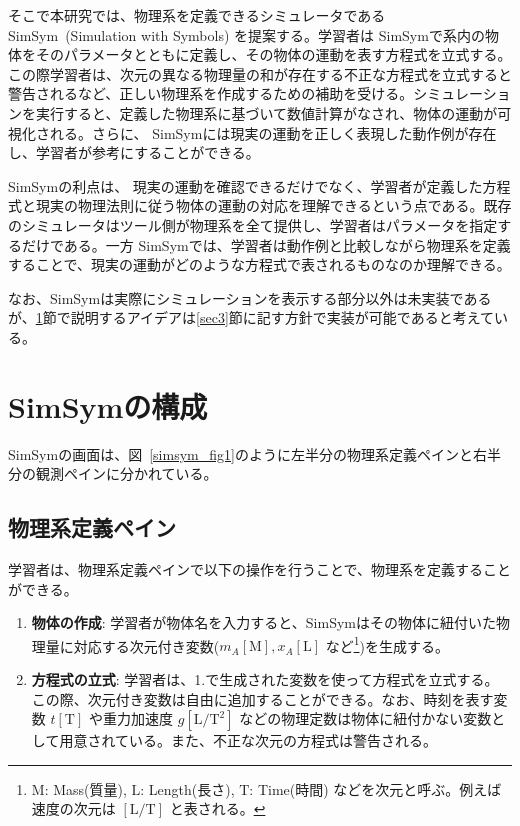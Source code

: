 \documentclass[11pt, a4paper, oneside, twocolumn, dvipdfmx]{jsarticle}
\newcommand{\simname}{SimSym}
\newcommand{\simnamealt}{Simulation with Symbols}
\begin{document}
そこで本研究では、物理系を定義できるシミュレータである \simname~(\simnamealt) を提案する。学習者は \simname で系内の物体をそのパラメータとともに定義し、その物体の運動を表す方程式を立式する。この際学習者は、次元の異なる物理量の和が存在する不正な方程式を立式すると警告されるなど、正しい物理系を作成するための補助を受ける。シミュレーションを実行すると、定義した物理系に基づいて数値計算がなされ、物体の運動が可視化される。さらに、 \simname には現実の運動を正しく表現した動作例が存在し、学習者が参考にすることができる。

\simname の利点は、
現実の運動を確認できるだけでなく、学習者が定義した方程式と現実の物理法則に従う物体の運動の対応を理解できるという点である。既存のシミュレータはツール側が物理系を全て提供し、学習者はパラメータを指定するだけである。一方 \simname では、学習者は動作例と比較しながら物理系を定義することで、現実の運動がどのような方程式で表されるものなのか理解できる。

なお、\simname は実際にシミュレーションを表示する部分以外は未実装であるが、\ref{sec2}節で説明するアイデアは\ref{sec3}節に記す方針で実装が可能であると考えている。

\section{\simname の構成} \label{sec2}

\simname の画面は、図~\ref{simsym_fig1}のように左半分の物理系定義ペインと右半分の観測ペインに分かれている。

\subsection*{物理系定義ペイン}

学習者は、物理系定義ペインで以下の操作を行うことで、物理系を定義することができる。

\begin{enumerate}
\item \textbf{物体の作成}: 学習者が物体名を入力すると、\simname はその物体に紐付いた物理量に対応する次元付き変数($m_A\mathrm{[M]}, x_A\mathrm{[L]}$ など\footnote{$\mathrm{M}$: Mass(質量), $\mathrm{L}$: Length(長さ), $\mathrm{T}$: Time(時間) などを次元と呼ぶ。例えば速度の次元は $\mathrm{[L/T]}$ と表される。})を生成する。
\item \textbf{方程式の立式}: 学習者は、1.で生成された変数を使って方程式を立式する。この際、次元付き変数は自由に追加することができる。なお、時刻を表す変数 $t\mathrm{[T]}$ や重力加速度 $g\mathrm{[L/T^2]}$ などの物理定数は物体に紐付かない変数として用意されている。また、不正な次元の方程式は警告される。
\end{enumerate}
\end{document}
